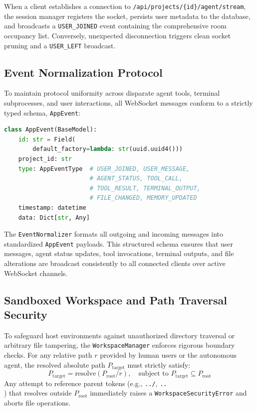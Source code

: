 \documentclass[conference]{IEEEtran}
\begin{document}
When a client establishes a connection to \texttt{/api/projects/\{id\}/agent/stream}, the session manager registers the socket, persists user metadata to the database, and broadcasts a \texttt{USER\_JOINED} event containing the comprehensive room occupancy list. Conversely, unexpected disconnection triggers clean socket pruning and a \texttt{USER\_LEFT} broadcast.

\subsection{Event Normalization Protocol}
To maintain protocol uniformity across disparate agent tools, terminal subprocesses, and user interactions, all WebSocket messages conform to a strictly typed schema, \texttt{AppEvent}:
\begin{lstlisting}[language=Python]
class AppEvent(BaseModel):
    id: str = Field(
        default_factory=lambda: str(uuid.uuid4()))
    project_id: str
    type: AppEventType  # USER_JOINED, USER_MESSAGE, 
                        # AGENT_STATUS, TOOL_CALL, 
                        # TOOL_RESULT, TERMINAL_OUTPUT,
                        # FILE_CHANGED, MEMORY_UPDATED
    timestamp: datetime
    data: Dict[str, Any]
\end{lstlisting}
The \texttt{EventNormalizer} formats all outgoing and incoming messages into standardized \texttt{AppEvent} payloads. This structured schema ensures that user messages, agent status updates, tool invocations, terminal outputs, and file alterations are broadcast consistently to all connected clients over active WebSocket channels.

\subsection{Sandboxed Workspace and Path Traversal Security}
To safeguard host environments against unauthorized directory traversal or arbitrary file tampering, the \texttt{WorkspaceManager} enforces rigorous boundary checks. For any relative path $r$ provided by human users or the autonomous agent, the resolved absolute path $P_{\text{target}}$ must strictly satisfy:
\begin{equation}
P_{\text{target}} = \text{resolve}(P_{\text{root}} / r), \quad \text{subject to } P_{\text{target}} \subseteq P_{\text{root}}
\end{equation}
Any attempt to reference parent tokens (e.g., \texttt{../}, \texttt{..\\}) that resolves outside $P_{\text{root}}$ immediately raises a \texttt{WorkspaceSecurityError} and aborts file operations.
\end{document}
